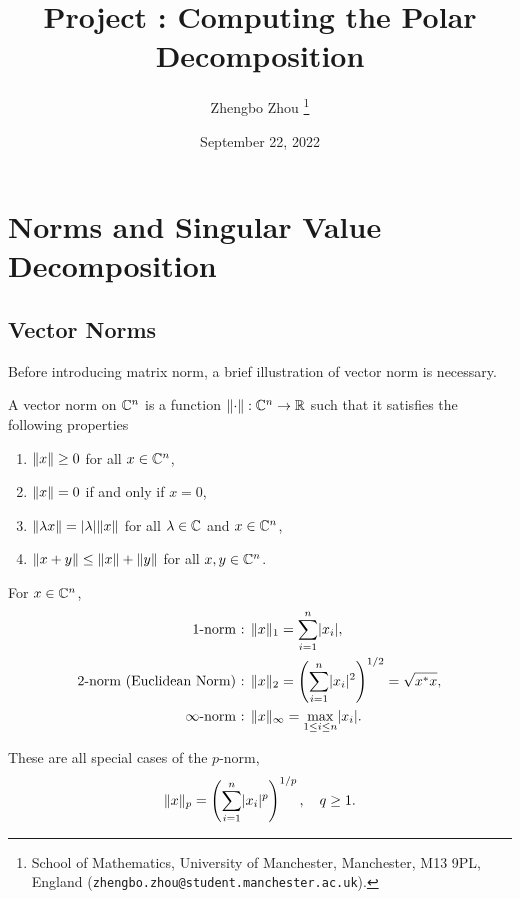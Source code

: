 \documentclass[12pt]{article}
\title{Project : Computing the Polar Decomposition}
\author{Zhengbo Zhou%
    \thanks{%
        School of Mathematics,
        University of Manchester,
        Manchester, M13 9PL, England
        (\texttt{zhengbo.zhou@student.manchester.ac.uk}).
    }
}
\date{September 22, 2022}
\begin{document}
\maketitle
\tableofcontents
\newpage

\section{Norms and Singular Value Decomposition}\label{sec:norms-svd}

\subsection{Vector Norms} \label{subsec:vector-norms}

Before introducing matrix norm, a brief illustration of vector norm is necessary.

\begin{definition}
   \label{def:vector-norm}
  A vector norm on $\mathbb{C}^n$ is a function $\|{\cdot}\| : \mathbb{C}^n \to \mathbb{R}$ such that it satisfies the following properties
  \begin{enumerate}
    \item $\|{x}\| \geq 0$ for all $x\in\mathbb{C}^n$,
    \item $\|{x}\| = 0$ if and only if $x = 0$,
    \item $\|{\lambda x}\| = \lvert\lambda\rvert \|{x}\|$ for all $\lambda \in \mathbb{C}$ and $x \in \mathbb{C}^n$,
    \item $\|{x + y}\| \leq \|{x}\| + \|{y}\|$ for all $x,y\in \mathbb{C}^n$.
  \end{enumerate}
\end{definition}

\begin{example}
    For $x\in\mathbb{C}^n$, 
    \begin{equation}\notag
        \begin{aligned}
            \text{1-norm : }& \|{x}\|_1 = \sum_{i = 1}^n \lvert x_i\rvert,\\
            \text{2-norm (Euclidean Norm) : }& \|{x}\|_2 = \left(\sum_{i = 1}^n \lvert x_i\rvert^2\right)^{1/2} = \sqrt{x^* x},\\
            \text{$\infty$-norm : } & \|{x}\|_{\infty} = \max_{1\leq i \leq n} \lvert x_i\rvert.
        \end{aligned}
    \end{equation}
    
    These are all special cases of the $p$-norm,
    \begin{equation}\label{eq:vector-p-norm}
        \|{x}\|_p = \left(\sum_{i = 1}^n \lvert x_i\rvert^p\right)^{1/p},\quad q \geq 1.
    \end{equation}
\end{example}
\end{document}
